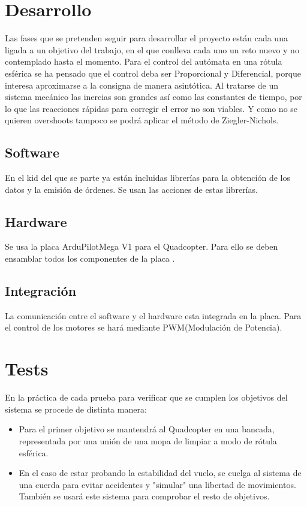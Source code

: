 \documentclass{article}
\begin{document}
\section{Desarrollo}
Las fases que se pretenden seguir para desarrollar el proyecto están cada una ligada a un objetivo del trabajo, en el que conlleva cada uno un reto nuevo y no contemplado hasta el momento. Para el control del autómata en una rótula esférica se ha pensado que el control deba ser Proporcional y Diferencial, porque interesa aproximarse a la consigna de manera asintótica. Al tratarse de un sistema mecánico las inercias son grandes así como las constantes de tiempo, por lo que las reacciones rápidas para corregir el error no son viables. Y como no se quieren overshoots tampoco se podrá aplicar el método de Ziegler-Nichols.

\subsection{Software} 

En el kid del que se parte ya están incluidas librerías para la obtención de los datos y la emisión de órdenes. Se usan las acciones de estas librerías.

\subsection{Hardware} 

Se usa la placa ArduPilotMega V1 para el Quadcopter. Para ello se deben ensamblar todos los componentes de la placa \cite{2}.

\subsection{Integración}
La comunicación entre el software y el hardware esta integrada en la placa. Para el control de los motores se hará mediante PWM(Modulación de Potencia).

\section{Tests}
En la práctica de cada prueba para verificar que se cumplen los objetivos del sistema se procede de distinta manera: 
\begin{itemize}
	\item Para el primer objetivo se mantendrá al Quadcopter en una bancada, representada por una unión de una mopa de limpiar a modo de rótula esférica. 
	\item En el caso de estar probando la estabilidad del vuelo, se cuelga al sistema de una cuerda para evitar accidentes y "simular" una libertad de movimientos. También se usará este sistema para comprobar el resto de objetivos.
\end{itemize}
\end{document}
